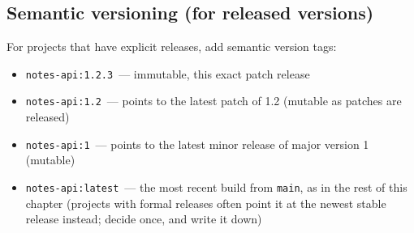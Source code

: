 \begin{codebox}[short]

\begin{Shaded}
\begin{Highlighting}[]

\end{Highlighting}
\end{Shaded}

\end{codebox}

\subsection*{Semantic versioning (for released versions)}\label{19-artifact-storage:semantic-versioning-for-released-versions}

For projects that have explicit releases, add semantic version tags:

\begin{codebox}[short]

\begin{Shaded}
\begin{Highlighting}[]
\DataTypeTok{\textbackslash{}}
  \DataTypeTok{\textbackslash{}}
  \DataTypeTok{\textbackslash{}}
  \DataTypeTok{\textbackslash{}}
  \DataTypeTok{\textbackslash{}}
\end{Highlighting}
\end{Shaded}

\end{codebox}

\begin{itemize}
\tightlist
\item
  \texttt{notes-api:1.2.3}~--- immutable, this exact patch release
\item
  \texttt{notes-api:1.2}~--- points to the latest patch of 1.2 (mutable as patches are released)
\item
  \texttt{notes-api:1}~--- points to the latest minor release of major version 1 (mutable)
\item
  \texttt{notes-api:latest}~--- the most recent build from \texttt{main}, as in the rest of this chapter (projects with formal releases often point it at the newest stable release instead; decide once, and write it down)
\end{itemize}

